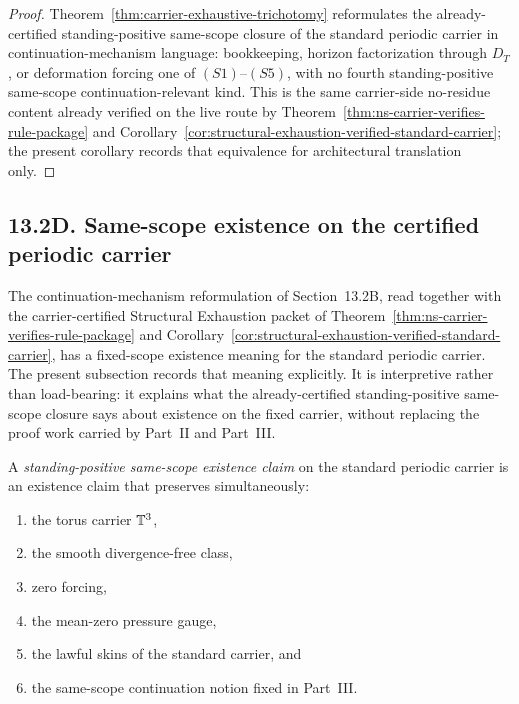 \begin{proof}
Theorem~\ref{thm:carrier-exhaustive-trichotomy} reformulates the already-certified standing-positive
same-scope closure of the standard periodic carrier in continuation-mechanism language: bookkeeping,
horizon factorization through $D_T$, or deformation forcing one of $(S1)$--$(S5)$, with no fourth
standing-positive same-scope continuation-relevant kind. This is the same carrier-side no-residue
content already verified on the live route by Theorem~\ref{thm:ns-carrier-verifies-rule-package} and
Corollary~\ref{cor:structural-exhaustion-verified-standard-carrier}; the present corollary records that
equivalence for architectural translation only.
\end{proof}



\subsection*{13.2D. Same-scope existence on the certified periodic carrier}
The continuation-mechanism reformulation of Section~13.2B, read together with the carrier-certified
Structural Exhaustion packet of Theorem~\ref{thm:ns-carrier-verifies-rule-package} and
Corollary~\ref{cor:structural-exhaustion-verified-standard-carrier}, has a fixed-scope existence
meaning for the standard periodic carrier. The present subsection records that meaning explicitly. It
is interpretive rather than load-bearing: it explains what the already-certified standing-positive
same-scope closure says about existence on the fixed carrier, without replacing the proof work carried
by Part~II and Part~III.

\begin{manualdefinition}
\label{def:same-scope-existence-claim}
A \emph{standing-positive same-scope existence claim} on the standard periodic carrier is an existence claim that
preserves simultaneously:
\begin{enumerate}[label=(\roman*), leftmargin=2.2em]
\item the torus carrier $\mathbb{T}^3$,
\item the smooth divergence-free class,
\item zero forcing,
\item the mean-zero pressure gauge,
\item the lawful skins of the standard carrier, and
\item the same-scope continuation notion fixed in Part~III.
\end{enumerate}
\end{manualdefinition}

